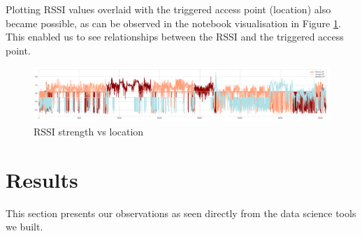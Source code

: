 \documentclass[fleqn,10pt]{SelfArx} %
\begin{document}
Plotting RSSI values overlaid with the triggered access point (location) also became possible, as can be observed in the notebook visualisation in Figure \ref{fig:rssi-signal}. This enabled us to see relationships between the RSSI and the triggered access point. 

\begin{figure}[!h] \centering
	\includegraphics[scale=0.6]{rssi-signal} 
	\caption{RSSI strength vs location}
	\label{fig:rssi-signal}
\end{figure}

	\section{Results}
This section presents our observations as seen directly from the data science tools we built.
\end{document}
